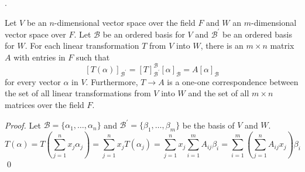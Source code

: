 \documentclass[8pt]{beamer}
\newcommand{\mc}[1]{\mathcal{#1}}
\newcommand{\ti}[1]{\textit{#1}}
\begin{document}
\begin{frame}{.}
    \begin{theorem}
        Let $V$ be an $n$-dimensional vector space over the field $F$ and $W$ an $m$-dimensional vector space over $F$.
        Let $\mc{B}$ be an ordered basis for $V$ and $\mc{B}^\prime$ be an ordered basis for $W$. For each linear transformation $T$ from $V$ into $W$, there is an $m\times n$ matrix $A$ with entries in $F$ such that
        \[
            [T(\alpha)]_{\mc{B}^\prime} =[T]^{\mc{B}}_{\mc{B}^\prime}[\alpha]_{\mc{B}} = A [\alpha]_{\mc{B}}
        \]
        for every vector $\alpha$ in $V$.
        Furthermore, $T\to A$ is a one-one correspondence between the set of all linear transformations from $V$ into $W$ and the set of all $m \times n$ matrices over the field $F$.
    \end{theorem}

    \ti{Proof.} Let $\mc{B} = \{\alpha_1, \dots, \alpha_n\}$ and $\mc{B}^\prime = \{\beta_1, \dots, \beta_m\}$ be the basis of $V$ and $W$.
    \[
        T(\alpha) = T\left(\sum_{j=1}^n x_j \alpha_j \right) = \sum_{j=1}^n x_j T(\alpha_j) = \sum_{j=1}^n x_j \sum_{i=1}^m A_{ij} \beta_i = \sum_{i=1}^m \left(\sum_{j=1}^n A_{ij}x_j\right)\beta_i
    \]
    \qed
\end{frame}
\end{document}
